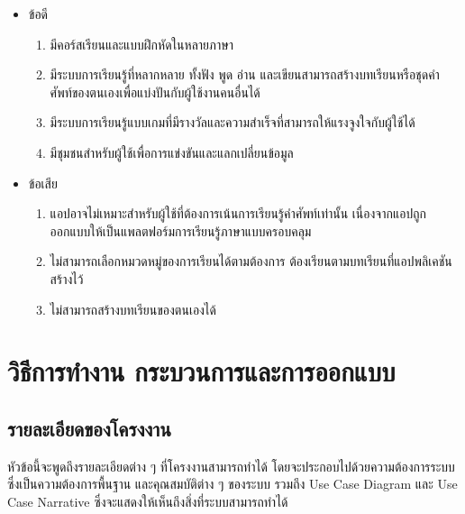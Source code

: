 \documentclass[12pt,oneside,openright,a4paper]{cpe-thai-project}
\begin{document}
\begin{itemize}
	\item ข้อดี
	      \begin{enumerate}
		      \item มีคอร์สเรียนและแบบฝึกหัดในหลายภาษา
		      \item มีระบบการเรียนรู้ที่หลากหลาย ทั้งฟัง พูด อ่าน และเขียนสามารถสร้างบทเรียนหรือชุดคำศัพท์ของตนเองเพื่อแบ่งปันกับผู้ใช้งานคนอื่นได้
		      \item มีระบบการเรียนรู้แบบเกมที่มีรางวัลและความสำเร็จที่สามารถให้แรงจูงใจกับผู้ใช้ได้
		      \item มีชุมชนสำหรับผู้ใช้เพื่อการแข่งขันและแลกเปลี่ยนข้อมูล
	      \end{enumerate}
	\item ข้อเสีย
	      \begin{enumerate}
		      \item แอปอาจไม่เหมาะสำหรับผู้ใช้ที่ต้องการเน้นการเรียนรู้คำศัพท์เท่านั้น เนื่องจากแอปถูกออกแบบให้เป็นแพลตฟอร์มการเรียนรู้ภาษาแบบครอบคลุม
		      \item ไม่สามารถเลือกหมวดหมู่ของการเรียนได้ตามต้องการ ต้องเรียนตามบทเรียนที่แอปพลิเคชันสร้างไว้
		      \item ไม่สามารถสร้างบทเรียนของตนเองได้
	      \end{enumerate}
\end{itemize}


\chapter{วิธีการทำงาน กระบวนการและการออกแบบ}

\section{รายละเอียดของโครงงาน}
\hspace{1cm}
หัวข้อนี้จะพูดถึงรายละเอียดต่าง ๆ ที่โครงงานสามารถทำได้ โดยจะประกอบไปด้วยความต้องการระบบ
ซึ่งเป็นความต้องการพื้นฐาน และคุณสมบัติต่าง ๆ ของระบบ รวมถึง Use Case Diagram
และ Use Case Narrative ซึ่งจะแสดงให้เห็นถึงสิ่งที่ระบบสามารถทำได้
\end{document}
